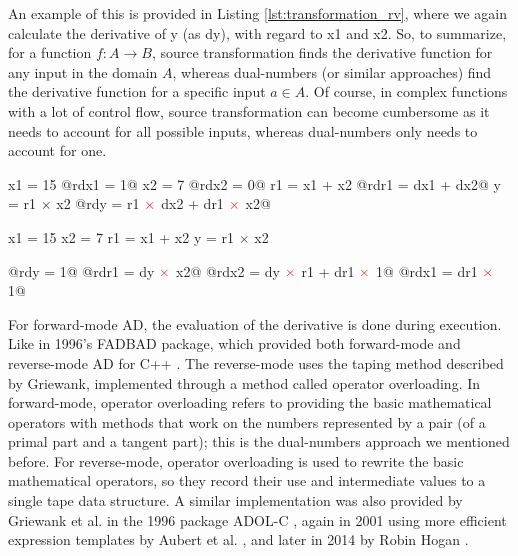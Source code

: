         An example of this is provided in Listing \ref{lst:transformation_rv}, where we again calculate the derivative of y (as dy), with regard to x1 and x2.
        So, to summarize, for a function $f:A\to B$, source transformation finds the derivative function for any input in the domain $A$, whereas dual-numbers (or similar approaches) find the derivative function for a specific input $a\in A$.
        Of course, in complex functions with a lot of control flow, source transformation can become cumbersome as it needs to account for all possible inputs, whereas dual-numbers only needs to account for one.

        \begin{quicklst}[caption={An example of forward mode AD by source transformation, with the AD statements in red}, label=lst:transformation_fw, gobble=12]
             x1 = 15
            @rdx1 = 1@
             x2 = 7
            @rdx2 = 0@
             r1 = x1 + x2
            @rdr1 = dx1 + dx2@
             y  = r1 $\times$ x2
            @rdy  = r1 $\color{red}\times$ dx2 + dr1 $\color{red}\times$ x2@
        \end{quicklst}

        \begin{quicklst}[caption={An example of reverse mode AD by source transformation, with the AD statements in red}, label=lst:transformation_rv, gobble=12]
             x1 = 15
             x2 = 7
             r1 = x1 + x2
             y  = r1 $\times$ x2

            @rdy  = 1@
            @rdr1 = dy $\color{red}\times$ x2@
            @rdx2 = dy $\color{red}\times$ r1 + dr1 $\color{red}\times$ 1@
            @rdx1 = dr1 $\color{red}\times$ 1@
        \end{quicklst}
        
        For forward-mode AD, the evaluation of the derivative is done during execution.
        Like in 1996's FADBAD package, which provided both forward-mode and reverse-mode AD for C++ \cite{bendtsen1996fadbad}.
        The reverse-mode uses the taping method described by Griewank, implemented through a method called operator overloading.
        In forward-mode, operator overloading refers to providing the basic mathematical operators with methods that work on the numbers represented by a pair (of a primal part and a tangent part); this is the dual-numbers approach we mentioned before.
        For reverse-mode, operator overloading is used to rewrite the basic mathematical operators, so they record their use and intermediate values to a single tape data structure.
        A similar implementation was also provided by Griewank et al. in the 1996 package ADOL-C \cite{griewank1996algorithm}, again in 2001 using more efficient expression templates by Aubert et al. \cite{aubert2001automatic}, and later in 2014 by Robin Hogan \cite{hogan2014fast}.

